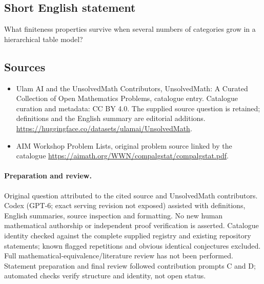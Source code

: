 \documentclass[11pt]{article}
\begin{document}
\subsection{Short English statement}
What finiteness properties survive when several numbers of categories grow in a hierarchical table model?
\subsection{Sources}
\begin{itemize}
\item[\hypertarget{source:statement:1}{S1}] Ulam AI and the UnsolvedMath Contributors, UnsolvedMath: A Curated Collection of Open Mathematics Problems, catalogue entry. Catalogue curation and metadata: CC BY 4.0. The supplied source question is retained; definitions and the English summary are editorial additions.
\url{https://huggingface.co/datasets/ulamai/UnsolvedMath}.
\item[\hypertarget{source:statement:2}{S2}] AIM Workshop Problem Lists, original problem source linked by the catalogue
\url{https://aimath.org/WWN/compalgstat/compalgstat.pdf}.
\end{itemize}
\paragraph{Preparation and review.}
Original question attributed to the cited source and UnsolvedMath contributors. Codex (GPT-6; exact serving revision not exposed) assisted with definitions, English summaries, source inspection and formatting. No new human mathematical authorship or independent proof verification is asserted. Catalogue identity checked against the complete supplied registry and existing repository statements; known flagged repetitions and obvious identical conjectures excluded. Full mathematical-equivalence/literature review has not been performed. Statement preparation and final review followed contribution prompts C and D; automated checks verify structure and identity, not open status.
\label{end:statement}
\end{document}
